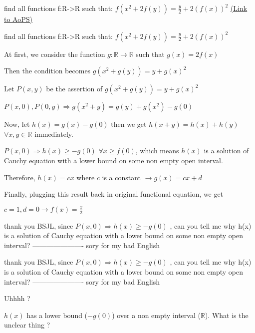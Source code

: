 \begin{problem}
	find all functions f:R->R such that:
$ f(x^{2}+2f(y))=\frac{y}{2}+2(f(x))^{2} $
	\flushright \href{https://artofproblemsolving.com/community/c6h602952}{(Link to AoPS)}
\end{problem}



\begin{solution}
	\begin{tcolorbox}find all functions f:R->R such that:
$ f(x^{2}+2f(y))=\frac{y}{2}+2(f(x))^{2} $\end{tcolorbox}

At first, we consider the function $ g: \mathbb{R} \rightarrow \mathbb{R} $ such that $ g(x)=2f(x) $

Then the condition becomes $ g(x^2+g(y))=y+g(x)^2 $

Let $ P(x,y) $ be the assertion of $ g(x^2+g(y))=y+g(x)^2 $

$ P(x,0),P(0,y) \Rightarrow g(x^2+y)=g(y)+g(x^2)-g(0) $

Now, let $ h(x)=g(x)-g(0) $ then we get $ h(x+y)=h(x)+h(y) $ $ \forall x,y \in \mathbb{R} $  immediately.

$ P(x,0) \Rightarrow h(x) \ge -g(0) $ $ \forall x \ge f(0) $, which means $ h(x) $ is a solution of Cauchy equation with a lower bound on some non empty open interval.

Therefore, $ h(x)=cx $ where $ c $ is a constant $ \rightarrow g(x)=cx+d $

Finally, plugging this result back in original functional equation, we get 

$ c=1,d=0 \rightarrow \boxed{f(x)=\frac{x}{2}} $
\end{solution}



\begin{solution}
	thank you BSJL, since $ P(x,0)\Rightarrow h(x)\ge-g(0) $ , can you tell me why h(x) is a solution of Cauchy equation with a lower bound on some non empty open interval?
----------------------
sory for my bad English
\end{solution}



\begin{solution}
	\begin{tcolorbox}thank you BSJL, since $ P(x,0)\Rightarrow h(x)\ge-g(0) $ , can you tell me why h(x) is a solution of Cauchy equation with a lower bound on some non empty open interval?
----------------------
sory for my bad English\end{tcolorbox}
Uhhhh ?

$h(x)$ has a lower bound ($-g(0)$) over a non empty interval ($\mathbb R$). What is the unclear thing ?
\end{solution}



